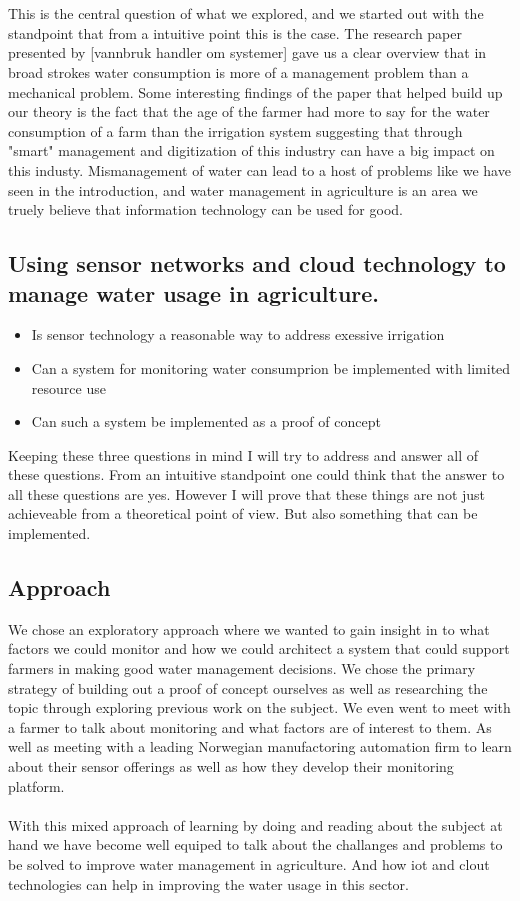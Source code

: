 \documentclass[]{uiophd}
\begin{document}
\\\\
This is the central question of what we explored, and we started out with the standpoint that from a intuitive point this is the case. The research paper presented by [vannbruk handler om systemer] gave us a clear overview that in broad strokes water consumption is more of a management problem than a mechanical problem. Some interesting findings of the paper that helped build up our theory is the fact that the age of the farmer had more to say for the water consumption of a farm than the irrigation system suggesting that through "smart" management and digitization of this industry can have a big impact on this industy. Mismanagement of water can lead to a host of problems like we have seen in the introduction, and water management in agriculture is an area we truely believe that information technology can be used for good.
\subsection{Using sensor networks and cloud technology to manage water usage in agriculture.}
\begin{itemize}
  \item Is sensor technology a reasonable way to address exessive irrigation
  \item Can a system for monitoring water consumprion be implemented with limited resource use
  \item Can such a system be implemented as a proof of concept
\end{itemize}
Keeping these three questions in mind I will try to address and answer all of these questions. From an intuitive standpoint one could think that the answer to all these questions are yes. However I will prove that these things are not just achieveable from a theoretical point of view. But also something that can be implemented.

\subsection{Approach}
We chose an exploratory approach where we wanted to gain insight in to what factors we could monitor and how we could architect a system that could support farmers in making good water management decisions. We chose the primary strategy of building out a proof of concept ourselves as well as researching the topic through exploring previous work on the subject. We even went to meet with a farmer to talk about monitoring and what factors are of interest to them. As well as meeting with a leading Norwegian manufactoring automation firm to learn about their sensor offerings as well as how they develop their monitoring platform.
\\\\
With this mixed approach of learning by doing and reading about the subject at hand we have become well equiped to talk about the challanges and problems to be solved to improve water management in agriculture. And how iot and clout technologies can help in improving the water usage in this sector.
\end{document}
